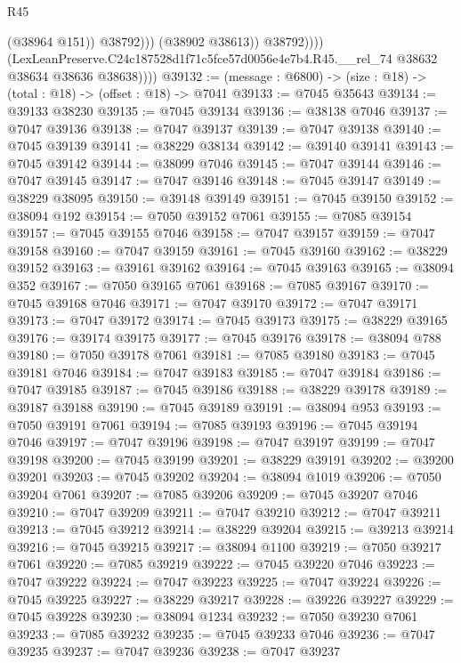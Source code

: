 \begin{lexlean}{R45}
\begin{coremodule}
{                            (@38964 @151))
                          @38792)))
                    (@38902 @38613))
                  @38792))))
          (LexLeanPreserve.C24c187528d1f71c5fce57d0056e4e7b4.R45.__rel_74
            @38632
            @38634
            @38636
            @38638))))
@39132 := (message : @6800) -> (size : @18) -> (total : @18) -> (offset : @18) -> @7041
@39133 := @7045 @35643
@39134 := @39133 @38230
@39135 := @7045 @39134
@39136 := @38138 @7046
@39137 := @7047 @39136
@39138 := @7047 @39137
@39139 := @7047 @39138
@39140 := @7045 @39139
@39141 := @38229 @38134
@39142 := @39140 @39141
@39143 := @7045 @39142
@39144 := @38099 @7046
@39145 := @7047 @39144
@39146 := @7047 @39145
@39147 := @7047 @39146
@39148 := @7045 @39147
@39149 := @38229 @38095
@39150 := @39148 @39149
@39151 := @7045 @39150
@39152 := @38094 @192
@39154 := @7050 @39152 @7061
@39155 := @7085 @39154
@39157 := @7045 @39155 @7046
@39158 := @7047 @39157
@39159 := @7047 @39158
@39160 := @7047 @39159
@39161 := @7045 @39160
@39162 := @38229 @39152
@39163 := @39161 @39162
@39164 := @7045 @39163
@39165 := @38094 @352
@39167 := @7050 @39165 @7061
@39168 := @7085 @39167
@39170 := @7045 @39168 @7046
@39171 := @7047 @39170
@39172 := @7047 @39171
@39173 := @7047 @39172
@39174 := @7045 @39173
@39175 := @38229 @39165
@39176 := @39174 @39175
@39177 := @7045 @39176
@39178 := @38094 @788
@39180 := @7050 @39178 @7061
@39181 := @7085 @39180
@39183 := @7045 @39181 @7046
@39184 := @7047 @39183
@39185 := @7047 @39184
@39186 := @7047 @39185
@39187 := @7045 @39186
@39188 := @38229 @39178
@39189 := @39187 @39188
@39190 := @7045 @39189
@39191 := @38094 @953
@39193 := @7050 @39191 @7061
@39194 := @7085 @39193
@39196 := @7045 @39194 @7046
@39197 := @7047 @39196
@39198 := @7047 @39197
@39199 := @7047 @39198
@39200 := @7045 @39199
@39201 := @38229 @39191
@39202 := @39200 @39201
@39203 := @7045 @39202
@39204 := @38094 @1019
@39206 := @7050 @39204 @7061
@39207 := @7085 @39206
@39209 := @7045 @39207 @7046
@39210 := @7047 @39209
@39211 := @7047 @39210
@39212 := @7047 @39211
@39213 := @7045 @39212
@39214 := @38229 @39204
@39215 := @39213 @39214
@39216 := @7045 @39215
@39217 := @38094 @1100
@39219 := @7050 @39217 @7061
@39220 := @7085 @39219
@39222 := @7045 @39220 @7046
@39223 := @7047 @39222
@39224 := @7047 @39223
@39225 := @7047 @39224
@39226 := @7045 @39225
@39227 := @38229 @39217
@39228 := @39226 @39227
@39229 := @7045 @39228
@39230 := @38094 @1234
@39232 := @7050 @39230 @7061
@39233 := @7085 @39232
@39235 := @7045 @39233 @7046
@39236 := @7047 @39235
@39237 := @7047 @39236
@39238 := @7047 @39237
}
\end{coremodule}
\end{lexlean}
